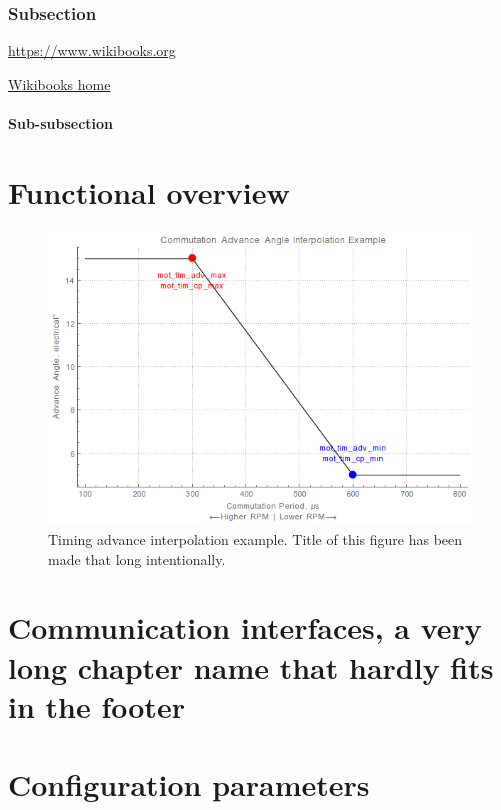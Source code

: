 \documentclass[a4paper,onecolumn,openany]{book}
\begin{document}
\subsection{Subsection}

\url{https://www.wikibooks.org}

\href{https://www.wikibooks.org}{Wikibooks home}

\subsubsection{Sub-subsection}

\lipsum[5]

\chapter{Functional overview}

\begin{figure}
  \includegraphics[width=\textwidth]{timing_advance_interpolation}
  \caption{Timing advance interpolation example. Title of this figure has been made that long intentionally.}
\end{figure}

\lipsum

\chapter{Communication interfaces, a very long chapter name that hardly fits in the footer}

\lipsum

\chapter{Configuration parameters}
\end{document}
